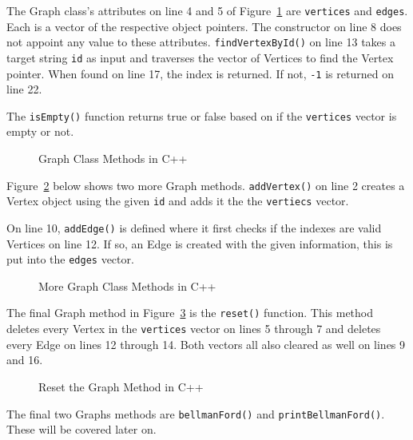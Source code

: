 \documentclass[letterpaper, 10pt,DIV=13]{scrartcl}
\numberwithin{equation}{section} %
\numberwithin{figure}{section} %
\numberwithin{table}{section} %
\begin{document}
The Graph class's attributes on line 4 and 5 of Figure~\ref{figure:GraphClass1} are \texttt{vertices} and \texttt{edges}. Each is a vector of the respective object pointers. The constructor on line 8 does not appoint any value to these attributes. \texttt{findVertexById()} on line 13 takes a target string \texttt{id} as input and traverses the vector of Vertices to find the Vertex pointer. When found on line 17, the index is returned. If not, \texttt{-1} is returned on line 22.

The \texttt{isEmpty()} function returns true or false based on if the \texttt{vertices} vector is empty or not.

\begin{figure}[ht] 
    \centering 
    
    \caption{Graph Class Methods in C++}
    \label{figure:GraphClass1}
\end{figure}


Figure~\ref{figure:GraphClass2} below shows two more Graph methods. \texttt{addVertex()} on line 2 creates a Vertex object using the given \texttt{id} and adds it the the \texttt{vertiecs} vector.

On line 10, \texttt{addEdge()} is defined where it first checks if the indexes are valid Vertices on line 12. If so, an Edge is created with the given information, this is put into the \texttt{edges} vector.

\begin{figure}[ht] 
    \centering 
    
    \caption{More Graph Class Methods in C++}
    \label{figure:GraphClass2}
\end{figure}


\pagebreak

The final Graph method in Figure~\ref{figure:GraphClass3} is the \texttt{reset()} function. This method deletes every Vertex in the \texttt{vertices} vector on lines 5 through 7 and deletes every Edge on lines 12 through 14. Both vectors all also cleared as well on lines 9 and 16. 

\begin{figure}[ht] 
    \centering 
    
    \caption{Reset the Graph Method in C++}
    \label{figure:GraphClass3}
\end{figure}

The final two Graphs methods are \texttt{bellmanFord()} and \texttt{printBellmanFord()}. These will be covered later on.
\end{document}
